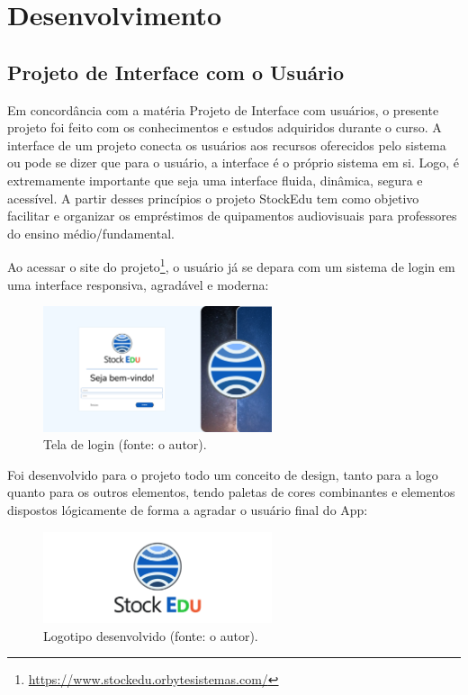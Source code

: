 \documentclass[
	12pt,				%
	openright,			%
	twoside,			%
	a4paper,			%
	english,			%
	french,				%
	spanish,			%
	brazil				%
	]{abntex2}
\begin{document}
\part{Desenvolvimento}

\chapter{Projeto de Interface com o Usuário}
Em concordância com a matéria Projeto de Interface com usuários, o presente
projeto foi feito com os conhecimentos e estudos adquiridos durante o curso. A
interface de um projeto conecta os usuários aos recursos oferecidos pelo sistema
ou pode se dizer que para o usuário, a interface é o próprio sistema em si. Logo, é
extremamente importante que seja uma interface fluida, dinâmica, segura e
acessível. A partir desses princípios o projeto StockEdu tem como objetivo facilitar e
organizar os empréstimos de quipamentos audiovisuais para professores do ensino
médio/fundamental.

Ao acessar o site do projeto\footnote{\url{https://www.stockedu.orbytesistemas.com/}}, o usuário já se depara com um sistema de login em uma interface responsiva, agradável e moderna:

\begin{figure}[htb]
	\centering
	\includegraphics[width=0.6\textwidth]{fig/print1-login.png}
	\caption{Tela de login (fonte: o autor).}
	\label{fig:print1-login}
\end{figure}

Foi desenvolvido para o projeto todo um conceito de design, tanto para a logo quanto para os outros elementos, tendo paletas de cores combinantes e elementos dispostos lógicamente de forma a agradar o usuário final do App:

\begin{figure}[htb]
	\centering
	\includegraphics[width=0.6\textwidth]{fig/Logo-do-projeto.png}
	\caption{Logotipo desenvolvido (fonte: o autor).}
	\label{fig:Logo-do-projeto}
\end{figure}
\end{document}
